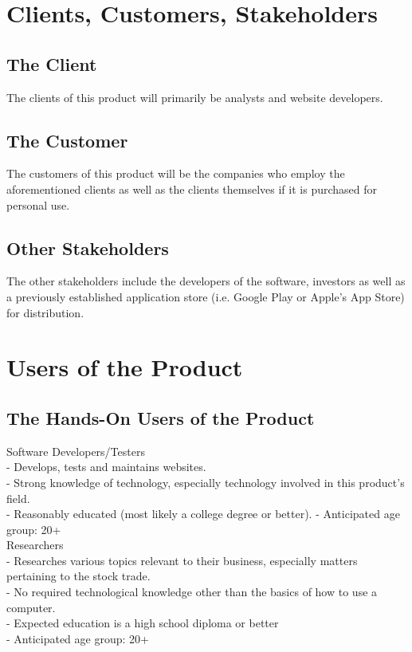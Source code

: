 \documentclass[titlepage]{article}
\begin{document}
\section{Clients, Customers, Stakeholders}

\subsection*{The Client}
The clients of this product will primarily be analysts and website developers.

\subsection*{The Customer}
The customers of this product will be the companies who employ the aforementioned clients as well as the clients themselves if it is purchased for personal use.

\subsection*{Other Stakeholders}
The other stakeholders include the developers of the software, investors as well as a previously established application store (i.e. Google Play or Apple’s App Store) for distribution.

\section{Users of the Product}

\subsection*{The Hands-On Users of the Product}
Software Developers/Testers\\
- Develops, tests and maintains websites.\\
- Strong knowledge of technology, especially technology involved in this product’s field.\\
- Reasonably educated (most likely a college degree or better).
- Anticipated age group: 20+\\

Researchers\\
- Researches various topics relevant to their business, especially matters pertaining to the stock trade.\\
- No required technological knowledge other than the basics of how to use a computer.\\
- Expected education is a high school diploma or better\\
- Anticipated age group: 20+\\
\end{document}

